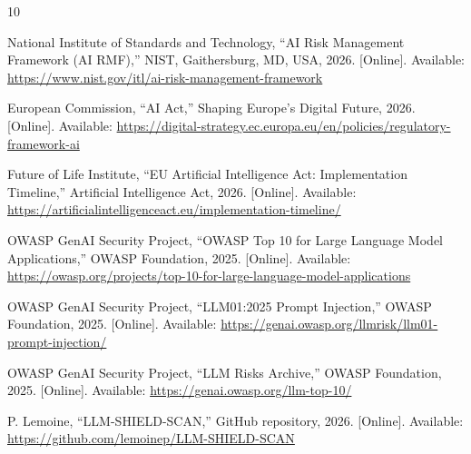 \documentclass[conference]{IEEEtran}
\begin{document}
\begin{thebibliography}{10}

National Institute of Standards and Technology,
``AI Risk Management Framework (AI RMF),''
NIST, Gaithersburg, MD, USA, 2026.
[Online]. Available:
\url{https://www.nist.gov/itl/ai-risk-management-framework}

European Commission,
``AI Act,''
Shaping Europe's Digital Future, 2026.
[Online]. Available:
\url{https://digital-strategy.ec.europa.eu/en/policies/regulatory-framework-ai}

Future of Life Institute,
``EU Artificial Intelligence Act: Implementation Timeline,''
Artificial Intelligence Act, 2026.
[Online]. Available:
\url{https://artificialintelligenceact.eu/implementation-timeline/}

OWASP GenAI Security Project,
``OWASP Top 10 for Large Language Model Applications,''
OWASP Foundation, 2025.
[Online]. Available:
\url{https://owasp.org/projects/top-10-for-large-language-model-applications}

OWASP GenAI Security Project,
``LLM01:2025 Prompt Injection,''
OWASP Foundation, 2025.
[Online]. Available:
\url{https://genai.owasp.org/llmrisk/llm01-prompt-injection/}

OWASP GenAI Security Project,
``LLM Risks Archive,''
OWASP Foundation, 2025.
[Online]. Available:
\url{https://genai.owasp.org/llm-top-10/}

P. Lemoine,
``LLM-SHIELD-SCAN,''
GitHub repository, 2026.
[Online]. Available:
\url{https://github.com/lemoinep/LLM-SHIELD-SCAN}

\end{thebibliography}
\end{document}
